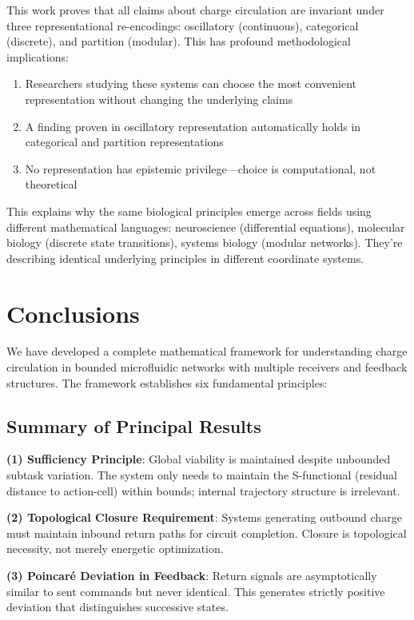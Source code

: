 \documentclass[twocolumn,11pt,a4paper]{article}
\begin{document}
This work proves that all claims about charge circulation are invariant under three representational re-encodings: oscillatory (continuous), categorical (discrete), and partition (modular). This has profound methodological implications:

\begin{enumerate}[label=(\arabic*),leftmargin=*]
\item Researchers studying these systems can choose the most convenient representation without changing the underlying claims
\item A finding proven in oscillatory representation automatically holds in categorical and partition representations
\item No representation has epistemic privilege—choice is computational, not theoretical
\end{enumerate}

This explains why the same biological principles emerge across fields using different mathematical languages: neuroscience (differential equations), molecular biology (discrete state transitions), systems biology (modular networks). They're describing identical underlying principles in different coordinate systems.

\section{Conclusions}
\label{sec:conclusions}

We have developed a complete mathematical framework for understanding charge circulation in bounded microfluidic networks with multiple receivers and feedback structures. The framework establishes six fundamental principles:

\subsection{Summary of Principal Results}

\textbf{(1) Sufficiency Principle}: Global viability is maintained despite unbounded subtask variation. The system only needs to maintain the S-functional (residual distance to action-cell) within bounds; internal trajectory structure is irrelevant.

\textbf{(2) Topological Closure Requirement}: Systems generating outbound charge must maintain inbound return paths for circuit completion. Closure is topological necessity, not merely energetic optimization.

\textbf{(3) Poincaré Deviation in Feedback}: Return signals are asymptotically similar to sent commands but never identical. This generates strictly positive deviation that distinguishes successive states.
\end{document}

